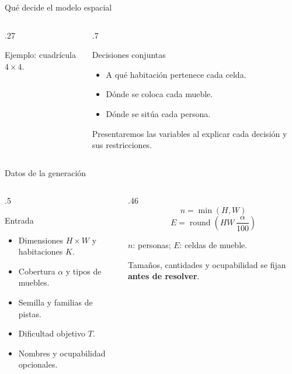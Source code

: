 \documentclass[aspectratio=169,11pt]{beamer}
\begin{document}
\begin{frame}{Qu\'e decide el modelo espacial}
  \begin{columns}[T,onlytextwidth]
    \begin{column}{.27\textwidth}
      \centering
      \par\smallskip
      \small Ejemplo: cuadr\'icula \(4\times4\).
    \end{column}
    \begin{column}{.7\textwidth}
      \begin{block}{Decisiones conjuntas}
        \begin{itemize}
          \item A qu\'e habitaci\'on pertenece cada celda.
          \item D\'onde se coloca cada mueble.
          \item D\'onde se sit\'ua cada persona.
        \end{itemize}
      \end{block}
      \small Presentaremos las variables al explicar cada decisi\'on
      y sus restricciones.
    \end{column}
  \end{columns}
\end{frame}

\begin{frame}{Datos de la generaci\'on}
  \begin{columns}[T,onlytextwidth]
    \begin{column}{.5\textwidth}
      \begin{block}{Entrada}
        \begin{itemize}
          \item Dimensiones \(H\times W\) y habitaciones \(K\).
          \item Cobertura \(\alpha\) y tipos de muebles.
          \item Semilla y familias de pistas.
          \item Dificultad objetivo \(T\).
          \item Nombres y ocupabilidad opcionales.
        \end{itemize}
      \end{block}
    \end{column}
    \begin{column}{.46\textwidth}
      \[
        n=\min(H,W)
      \]
      \[
        E=\operatorname{round}\left(HW\,\frac{\alpha}{100}\right)
      \]

      \small \(n\): personas; \(E\): celdas de mueble.
      \par\medskip
      Tama\~nos, cantidades y ocupabilidad se fijan
      \textbf{antes de resolver}.
    \end{column}
  \end{columns}
\end{frame}
\end{document}
